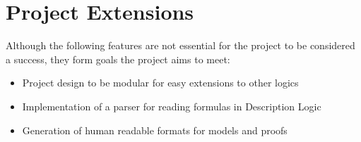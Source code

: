 \documentclass[12pt]{article}
\begin{document}
\section{Project Extensions}

Although the following features are not essential for the project to be considered a success, they
form goals the project aims to meet:

\begin{itemize}
\item Project design to be modular for easy extensions to other logics
\item Implementation of a parser for reading formulas in Description Logic
\item Generation of human readable formats for models and proofs
\end{itemize}
\end{document}
